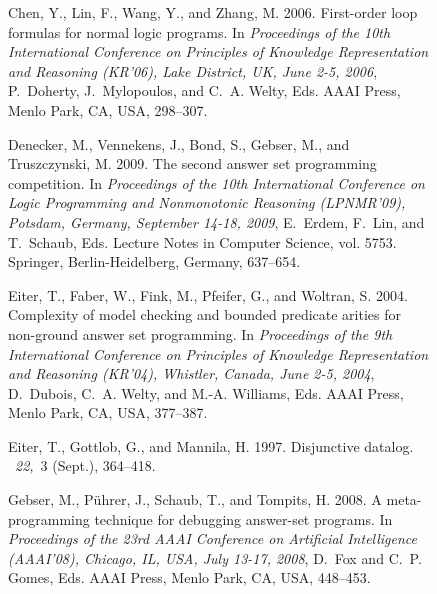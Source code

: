 \documentclass{tlp}
\begin{document}
\begin{figure}[t]
\begin{small}
\begin{thebibliography}{}
{\sc Chen, Y.}, {\sc Lin, F.}, {\sc Wang, Y.}, {\sc and} {\sc Zhang, M.} 2006.
\newblock First-order loop formulas for normal logic programs.
\newblock In {\em Proceedings of the 10th International Conference on
  Principles of Knowledge Representation and Reasoning {\rm (}KR'06{\rm )},
  Lake District, UK, June 2-5, 2006}, {P.~Doherty}, {J.~Mylopoulos}, {and}
  {C.~A. Welty}, Eds. AAAI Press, Menlo Park, CA, USA, 298--307.

{\sc Denecker, M.}, {\sc Vennekens, J.}, {\sc Bond, S.}, {\sc Gebser, M.}, {\sc
  and} {\sc Truszczynski, M.} 2009.
\newblock The second answer set programming competition.
\newblock In {\em Proceedings of the 10th International Conference on Logic
  Programming and Nonmonotonic Reasoning {\rm (}LPNMR'09{\rm )}, Potsdam,
  Germany, September 14-18, 2009}, {E.~Erdem}, {F.~Lin}, {and} {T.~Schaub},
  Eds. Lecture Notes in Computer Science, vol. 5753. Springer,
  Berlin-Heidelberg, Germany, 637--654.

{\sc Eiter, T.}, {\sc Faber, W.}, {\sc Fink, M.}, {\sc Pfeifer, G.}, {\sc and}
  {\sc Woltran, S.} 2004.
\newblock Complexity of model checking and bounded predicate arities for
  non-ground answer set programming.
\newblock In {\em Proceedings of the 9th International Conference on Principles
  of Knowledge Representation and Reasoning {\rm (}KR'04{\rm )}, Whistler,
  Canada, June 2-5, 2004}, {D.~Dubois}, {C.~A. Welty}, {and} {M.-A. Williams},
  Eds. AAAI Press, Menlo Park, CA, USA, 377--387.

{\sc Eiter, T.}, {\sc Gottlob, G.}, {\sc and} {\sc Mannila, H.} 1997.
\newblock Disjunctive datalog.
~{\em 22,\/}~3 (Sept.),
  364--418.

{\sc Gebser, M.}, {\sc P{\"u}hrer, J.}, {\sc Schaub, T.}, {\sc and} {\sc
  Tompits, H.} 2008.
\newblock A meta-programming technique for debugging answer-set programs.
\newblock In {\em Proceedings of the 23rd {AAAI} Conference on Artificial
  Intelligence {\rm (}AAAI'08{\rm )}, Chicago, IL, USA, July 13-17, 2008},
  {D.~Fox} {and} {C.~P. Gomes}, Eds. AAAI Press, Menlo Park, CA, USA, 448--453.


\end{thebibliography}
\end{small}
\end{figure}
\end{document}
